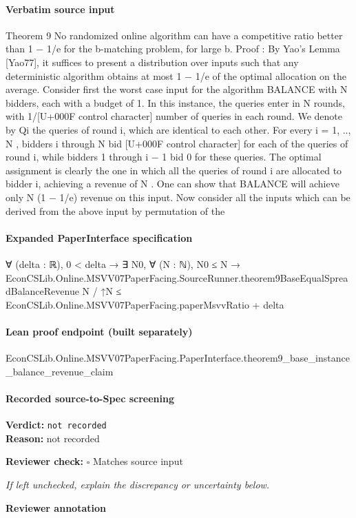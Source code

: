 \documentclass[10pt]{article}
\newcommand{\reviewerbox}{%
  \par\noindent\fbox{\parbox{0.96\linewidth}{\rule{0pt}{0.38in}}}\par
}
\newcommand{\reviewmatch}[1]{%
  \par\noindent\textbf{Reviewer check:} $\square$\; #1\par
  \noindent\emph{If left unchecked, explain the discrepancy or uncertainty below.}\par
}
\begin{document}
\paragraph{Verbatim source input}
\begin{ReviewVerbatim}
Theorem 9 No randomized online algorithm can have a competitive ratio better than 1 − 1/e
for the b-matching problem, for large b.
Proof : By Yao’s Lemma [Yao77], it suffices to present a distribution over inputs such that
any deterministic algorithm obtains at most 1 − 1/e of the optimal allocation on the average.
Consider first the worst case input for the algorithm BALANCE with N bidders, each with
a budget of 1. In this instance, the queries enter in N rounds, with 1/[U+000F control character] number of queries in
each round. We denote by Qi the queries of round i, which are identical to each other. For
every i = 1, .., N , bidders i through N bid [U+000F control character] for each of the queries of round i, while bidders 1
through i − 1 bid 0 for these queries. The optimal assignment is clearly the one in which all
the queries of round i are allocated to bidder i, achieving a revenue of N . One can show that
BALANCE will achieve only N (1 − 1/e) revenue on this input.
Now consider all the inputs which can be derived from the above input by permutation of the
\end{ReviewVerbatim}


\paragraph{Expanded PaperInterface specification}
\begin{ReviewVerbatim}
∀ (delta : ℝ),
  0 < delta →
    ∃ N0,
      ∀ (N : ℕ),
        N0 ≤ N →
          EconCSLib.Online.MSVV07PaperFacing.SourceRunner.theorem9BaseEqualSpreadBalanceRevenue N / ↑N ≤
            EconCSLib.Online.MSVV07PaperFacing.paperMsvvRatio + delta
\end{ReviewVerbatim}

\paragraph{Lean proof endpoint (built separately)}\begin{ReviewVerbatim}
EconCSLib.Online.MSVV07PaperFacing.PaperInterface.theorem9_base_instance_balance_revenue_claim
\end{ReviewVerbatim}

\paragraph{Recorded source-to-Spec screening}
\textbf{Verdict:} \texttt{not recorded}
\\
\textbf{Reason:} not recorded
\reviewmatch{Matches source input}
\noindent\textbf{Reviewer annotation}\par
\reviewerbox
\clearpage
\hypertarget{source-claim-aaab20fe03771587}{}
\end{document}
